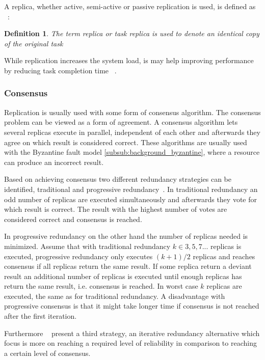 \documentclass{cslthse-msc}
\newtheorem{definition}{Definition}[chapter]
\begin{document}
A replica, whether active, semi-active or passive replication is used, is defined as ~\cite{effTaskReplMobGrid}:
\begin{definition} \label{def:replica}
The term replica or task replica is used to denote an identical copy of the original task
\end{definition}

While replication increases the system load, is may help improving performance by reducing task completion time ~\cite{improvingPerformanceReplication}.

\subsubsection*{Consensus} \label{subsub:consensus}
Replication is usually used with some form of consensus algorithm. The consensus problem can be viewed as a form of agreement. A consensus algorithm lets several replicas execute in parallel, independent of each other and afterwards they agree on which result is considered correct. These algorithms are usually used with the Byzantine fault model \cref{subsub:background_byzantine}, where a resource can produce an incorrect result.

Based on achieving consensus two different redundancy strategies can be identified, traditional and progressive redundancy~\cite{selfAdaptRel}. In traditional redundancy an odd number of replicas are executed simultaneously and afterwards they vote for which result is correct. The result with the highest number of votes are considered correct and consensus is reached.

In progressive redundancy on the other hand the number of replicas needed is minimized. Assume that with traditional redundancy $k \in {3,5,7...}$ replicas is executed, progressive redundancy only executes $(k+1)/2$ replicas and reaches consensus if all replicas return the same result. If some replica return a deviant result an additional number of replicas is executed until enough replicas has return the same result, i.e. consensus is reached. In worst case $k$ replicas are executed, the same as for traditional redundancy. A disadvantage with progressive consensus is that it might take longer time if consensus is not reached after the first iteration.

Furthermore ~\cite{selfAdaptRel} present a third strategy, an iterative redundancy alternative which focus is more on reaching a required level of reliability in comparison to reaching a certain level of consensus.
\end{document}
